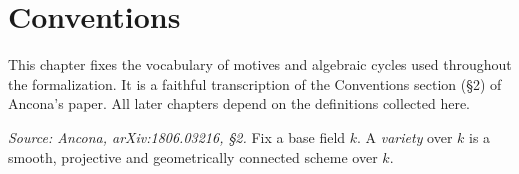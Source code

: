 \chapter{Conventions}

This chapter fixes the vocabulary of motives and algebraic cycles used throughout
the formalization. It is a faithful transcription of the Conventions section
(\S2) of Ancona's paper. All later chapters depend on the definitions collected here.

\begin{definition}[Variety]
  \label{def:variety}
  \textit{Source: Ancona, arXiv:1806.03216, §2.}
  Fix a base field \(k\). A \emph{variety} over \(k\) is a smooth, projective and
  geometrically connected scheme over \(k\).
\end{definition}

